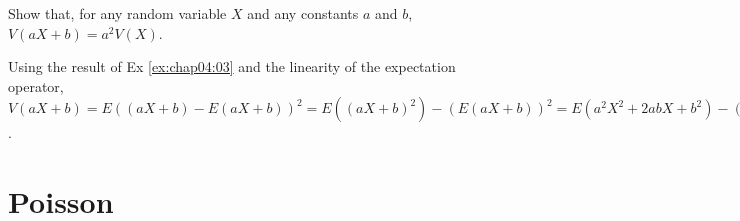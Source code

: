 \begin{exercise}
Show that, for any random variable $X$ and any constants $a$ and $b$, $V(aX + b) = a^2 V(X)$.
	\begin{solution}
	Using the result of Ex \ref{ex:chap04:03} and the linearity of the expectation operator, $V(aX + b) = E((aX + b) - E(aX + b))^2 = E((aX + b)^2) - (E(aX + b))^2 = E(a^2 X^2 + 2ab X + b^2) - (a E(X) + b)^2 = a^2 E(X^2) + 2ab E(X) + b^2 - (a^2 (E(X))^2 + 2ab E(X) + b^2) = a^2 (E(X^2) - (E(X))^2) = a^2 V(X)$.
	\end{solution}
\end{exercise}

\section{Poisson}
\label{sec:section-4.5}

